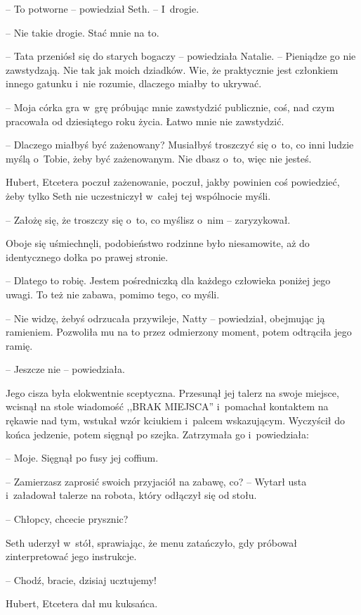 \documentclass[oneside,polish,11pt,sfheadings]{mwbk}
\begin{document}
-- To potworne -- powiedział Seth. -- I~drogie.

-- Nie takie drogie. Stać mnie na to.

-- Tata przeniósł się do starych bogaczy -- powiedziała Natalie. -- Pieniądze go nie zawstydzają. Nie tak jak moich dziadków. Wie, że
praktycznie jest członkiem innego gatunku i~nie rozumie, dlaczego miałby
to ukrywać.

-- Moja córka gra w~grę próbując mnie zawstydzić publicznie, coś, nad
czym pracowała od dziesiątego roku życia. Łatwo mnie nie zawstydzić.

-- Dlaczego miałbyś być zażenowany? Musiałbyś troszczyć się o~to, co inni
ludzie myślą o~Tobie, żeby być zażenowanym. Nie dbasz o~to, więc nie
jesteś.

Hubert, Etcetera poczuł zażenowanie, poczuł, jakby powinien coś
powiedzieć, żeby tylko Seth nie uczestniczył w~całej tej wspólnocie
myśli. 

-- Założę się, że troszczy się o~to, co myślisz o~nim -- zaryzykował.

Oboje się uśmiechnęli, podobieństwo rodzinne było niesamowite, aż do
identycznego dołka po prawej stronie. 

-- Dlatego to robię. Jestem
pośredniczką dla każdego człowieka poniżej jego uwagi. To też nie
zabawa, pomimo tego, co myśli.

-- Nie widzę, żebyś odrzucała przywileje, Natty -- powiedział, obejmując
ją ramieniem. Pozwoliła mu na to przez odmierzony moment, potem
odtrąciła jego ramię.

-- Jeszcze nie -- powiedziała.

Jego cisza była elokwentnie sceptyczna. Przesunął jej talerz na swoje
miejsce, wcisnął na stole wiadomość ,,BRAK MIEJSCA'' i~pomachał
kontaktem na rękawie nad tym, wstukał wzór kciukiem i~palcem
wskazującym. Wyczyścił do końca jedzenie, potem sięgnął po szejka.
Zatrzymała go i~powiedziała: 

-- Moje. Sięgnął po fusy jej coffium.

-- Zamierzasz zaprosić swoich przyjaciół na zabawę, co? -- Wytarł usta i~załadował talerze na robota, który odłączył się od stołu.

-- Chłopcy, chcecie prysznic?

Seth uderzył w~stół, sprawiając, że menu zatańczyło, gdy próbował
zinterpretować jego instrukcje. 

-- Chodź, bracie, dzisiaj ucztujemy!

Hubert, Etcetera dał mu kuksańca. 
\end{document}

